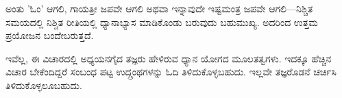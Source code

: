 ಅಂತು 'ಓಂ' ಆಗಲಿ, ಗಾಯತ್ರೀ ಜಪವೇ ಆಗಲಿ ಅಥವಾ ಇನ್ನಾವುದೇ ಇಷ್ಟಮಂತ್ರ ಜಪವೇ ಆಗಲಿ—ನಿಶ್ಚಿತ ಸಮಯದಲ್ಲಿ ನಿಶ್ಚಿತ ರೀತಿಯಲ್ಲಿ ಧ್ಯಾನಾಭ್ಯಾಸ ಮಾಡಿಕೊಂಡು ಬರುವುದು ಬಹುಮುಖ್ಯ. ಅದರಿಂದ ಉತ್ತಮ ಪ್ರಯೋಜನ ಬಂದೇಬರುತ್ತದೆ.

ಇವೆಲ್ಲ, ಈ ವಿಚಾರದಲ್ಲಿ ಅಧ್ಯಯನಗೈದ ತಜ್ಞರು ಹೇಳಿರುವ ಧ್ಯಾನ ಯೋಗದ ಮೂಲತತ್ವಗಳು. ಇದಕ್ಕೂ ಹೆಚ್ಚಿನ ವಿಚಾರ ಬೇಕೆಂದಿದ್ದರೆ ಸಂಬಂಧ ಪಟ್ಟ ಉದ್ಗ್ರಂಥಗಳನ್ನು ಓದಿ ತಿಳಿದುಕೊಳ್ಳಬಹುದು. ಇಲ್ಲವೇ ತಜ್ಞರೊಡನೆ ಚರ್ಚಿಸಿ ತಿಳಿದುಕೊಳ್ಳಲೂಬಹುದು.

\delimiter

